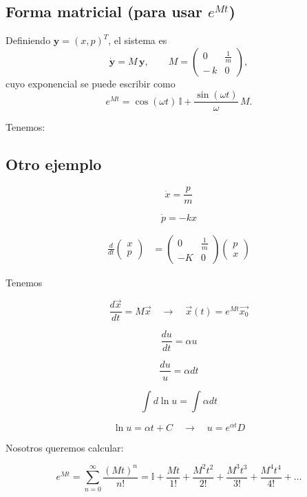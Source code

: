 \documentclass{article}
\begin{document}
\subsection*{Forma matricial (para usar $e^{Mt}$)}
Definiendo \( \mathbf{y}=(x,p)^{T}\), el sistema es
\[
\dot{\mathbf{y}}=M\,\mathbf{y},\qquad
M=
\begin{pmatrix}
0 & \tfrac{1}{m}\\[2pt]
-\,k & 0
\end{pmatrix},
\]
cuyo exponencial se puede escribir como
\[
e^{Mt}=
\cos(\omega t)\,\mathbb{I}+\frac{\sin(\omega t)}{\omega}\,M.
\]



Tenemos:

\subsection{Otro ejemplo}

\[\dot{x} = \frac{p}{m} \]

\[ \dot{p} = -kx \]


\begin{equation}
\begin{split}
\frac{d}{dt}\left(   \begin{array}{c}
x\\
p
\end{array} \right) &=  \left(   \begin{array}{cc}
0 & \frac{1}{m}\\
-K & 0
\end{array} \right)  \left(   \begin{array}{c}
p\\
x
\end{array} \right) 
\end{split}
\end{equation}


Tenemos


\[\frac{d \vec{x}}{dt} = M\vec{x} \quad \to \quad \vec{x}(t) = e^{Mt}\vec{x_{0}}  \]

\[ \frac{du}{dt} = \alpha u  \]

\[ \frac{du}{u} = \alpha dt \]

\[ \int\limits d \ln u = \int\limits \alpha dt\]

\[ \ln u = \alpha t + C \quad \to \quad u = e^{\alpha t}D \]

Nosotros queremos calcular:


\[ e^{Mt} = \sum\limits_{n=0}^{\infty} \frac{(Mt)^{n} }{n!} = \mathbb{I} + \frac{Mt}{1!} + \frac{M^{2}t^{2}}{2!} + \frac{ M^{3}t^{3} }{3!} + \frac{M^{4}t^{4}}{4!} + \ldots \]
\end{document}
